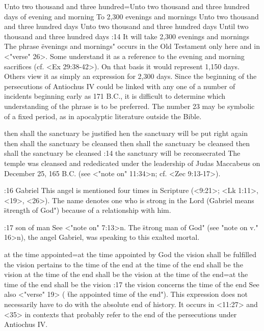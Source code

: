     {Unto two thousand and three hundred}={Unto two thousand and three hundred days of evening and morning} %
    {To 2,300 evenings and mornings} %
    {Unto two thousand and three hundred days} %
    {Unto two thousand and three hundred days} %
    {Until two thousand and three hundred days} %
:14 {It will take 2,300 evenings and mornings} The phrase 
 \"evenings and mornings" occurs in the Old Testament only here 
and in <"verse" 26>. Some understand it as a reference to the evening 
and morning sacrifices (cf. <Ex 29:38-42>). On that basis it would represent 1,150 days. Others view
it as simply an expression for 2,300  days. Since the beginning of the persecutions of Antiochus IV
could be linked with any one of a number of incidents beginning early as 171 B.C., it is difficult to determine which understanding of  
the phrase is to be preferred. The number 23 may be symbolic of a fixed period, as in apocalyptic literature outside the Bible.

    {then shall the sanctuary be justified} %
    {hen the sanctuary will be put right again} %
    {then shall the sanctuary be cleansed} %
    {then shall the sanctuary be cleansed} %
    {then shall the sanctuary be cleansed} %
:14 {the sanctuary will be reconsecrated} The temple was cleansed 
and rededicated under the leadership of Judas Maccabeus on December 25, 165 B.C. (see <"note on" 11:34>n;
cf. <Zec 9:13-17>). 

:16 {Gabriel} This angel is mentioned four times in Scripture 
(<9:21>; <Lk 1:11>, <19>, <26>). The name denotes one who is strong in the 
Lord (Gabriel means \"strength of God") because of a relationship 
with him.

:17 {son of man} See <"note on" 7:13>n. The \"strong man of God" (see \<"note on v." 16>n), the angel Gabriel, was speaking to this exalted mortal.


    {at the time appointed}={at the time appointed by God the vision shall be fulfilled} %
    {the vision pertains to the time of the end} %
    {at the time of the end shall be the vision} %
    {at the time of the end shall be the vision} %
    {at the time of the end}={at the time of the end shall be the vision} %
:17 {the vision concerns the time of the end} See also <"verse" 19> 
( \"the appointed time of the end"). This expression does not necessarily have to do with the absolute
end of history. It occurs in <11:27>  and <35> in contexts that probably refer to the end of the persecutions under Antiochus IV.

